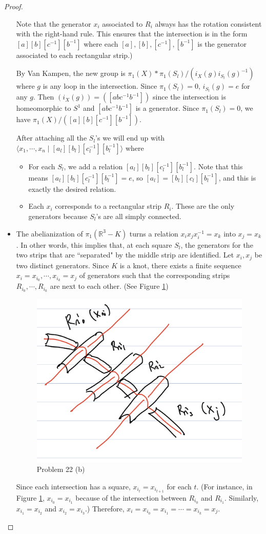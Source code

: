 \documentclass[12pt, psamsfonts]{amsart}
\theoremstyle{definition}
\theoremstyle{remark}
\numberwithin{equation}{section}
\begin{document}
\begin{proof}
\begin{itemize}
      Note that the generator $x_i$ associated to $R_i$ always has the rotation consistent with the right-hand rule.
      This ensures that the intersection is in the form $[a][b][c^{-1}][b^{-1}]$ where each $[a], [b], [c^{-1}], [b^{-1}]$ is the generator associated to each rectangular strip.)

      By Van Kampen, the new group is $\pi_1(X) * \pi_1(S_l) / (i_{X}(g)i_{S_l}(g)^{-1})$ where $g$ is any loop in the intersection.
      Since $\pi_1(S_l) = 0$, $i_{S_l}(g) = e$ for any $g$.
      Then $(i_X(g)) = ([abc^{-1}b^{-1}])$ since the intersection is homeomorphic to $S^1$ and $[abc^{-1}b^{-1}]$ is a generator.
      Since $\pi_1(S_l) = 0$, we have $\pi_1(X) / ([a][b][c^{-1}][b^{-1}])$.

      After attaching all the $S_l$'s we will end up with $\langle x_1, \cdots, x_n \mid [a_l][b_l][c_l^{-1}][b_l^{-1}] \rangle$ where

      \begin{itemize}
        \item
          For each $S_l$, we add a relation $[a_l][b_l][c_l^{-1}][b_l^{-1}]$.
          Note that this means $[a_l][b_l][c_l^{-1}][b_l^{-1}] = e$, so $[a_l] = [b_l][c_l][b_l^{-1}]$, and this is exactly the desired relation.
        \item
          Each $x_i$ corresponds to a rectangular strip $R_i$.
          These are the only generators because $S_l$'s are all simply connected.
      \end{itemize}
    \item
      The abelianization of $\pi_1(\mathbb{R}^3 - K)$ turns a relation $x_ix_jx_i^{-1} = x_k$ into $x_j = x_k$.
      In other words, this implies that, at each square $S_l$, the generators for the two strips that are ``separated" by the middle strip are identified.
      Let $x_i, x_j$ be two distinct generators.
      Since $K$ is a knot, there exists a finite sequence $x_i = x_{i_0}, \cdots, x_{i_k} = x_j$ of generators such that the corresponding strips $R_{i_0}, \cdots, R_{i_k}$ are next to each other.
      (See Figure \ref{fig:separated_knots})
      \begin{figure}
        \includegraphics[width=.5\linewidth]{separated_knots.jpeg}
        \caption{Problem 22 (b)}
        \label{fig:separated_knots}
      \end{figure}
      Since each intersection has a square, $x_{i_t} = x_{i_{t + 1}}$ for each $t$.
      (For instance, in Figure \ref{fig:separated_knots}, $x_{i_0} = x_{i_1}$ because of the intersection between $R_{i_0}$ and $R_{i_1}$. Similarly, $x_{i_1} = x_{i_2}$ and $x_{i_2} = x_{i_3}$.)
      Therefore, $x_i = x_{i_0} = x_{i_1} = \cdots = x_{i_k} = x_j$.


\end{itemize}
\end{proof}
\end{document}
